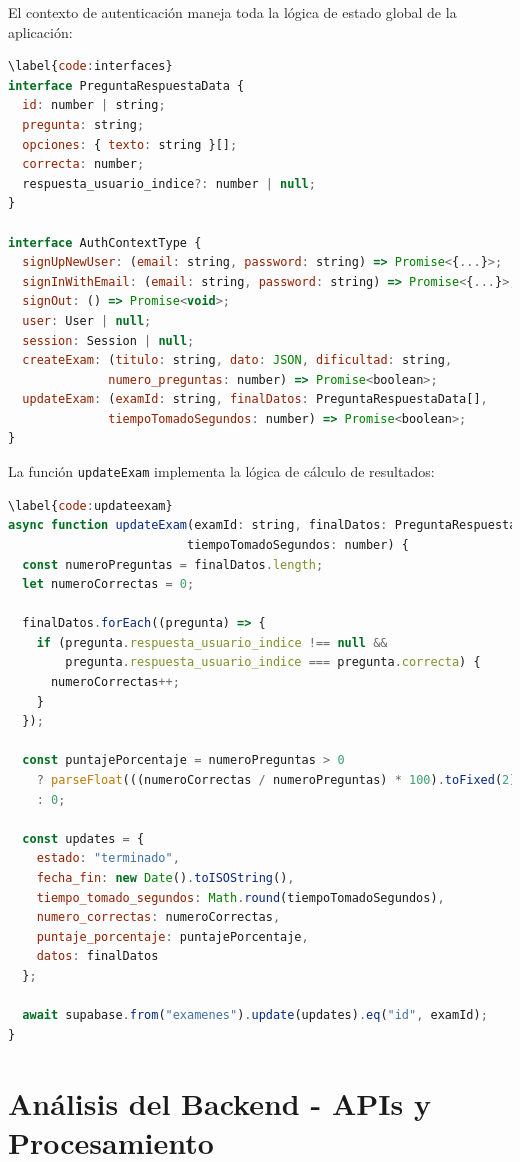 \documentclass[12pt,a4paper]{report}
\begin{document}
El contexto de autenticación maneja toda la lógica de estado global de la aplicación:

\begin{lstlisting}[language=JavaScript, caption={Código \ref{code:interfaces}: Interfaces de datos para preguntas}]
\label{code:interfaces}
interface PreguntaRespuestaData {
  id: number | string;
  pregunta: string;
  opciones: { texto: string }[];
  correcta: number;
  respuesta_usuario_indice?: number | null;
}

interface AuthContextType {
  signUpNewUser: (email: string, password: string) => Promise<{...}>;
  signInWithEmail: (email: string, password: string) => Promise<{...}>;
  signOut: () => Promise<void>;
  user: User | null;
  session: Session | null;
  createExam: (titulo: string, dato: JSON, dificultad: string, 
              numero_preguntas: number) => Promise<boolean>;
  updateExam: (examId: string, finalDatos: PreguntaRespuestaData[], 
              tiempoTomadoSegundos: number) => Promise<boolean>;
}
\end{lstlisting}

La función \texttt{updateExam} implementa la lógica de cálculo de resultados:

\begin{lstlisting}[language=JavaScript, caption={Código \ref{code:updateexam}: Algoritmo de cálculo de resultados}]
\label{code:updateexam}
async function updateExam(examId: string, finalDatos: PreguntaRespuestaData[], 
                         tiempoTomadoSegundos: number) {
  const numeroPreguntas = finalDatos.length;
  let numeroCorrectas = 0;

  finalDatos.forEach((pregunta) => {
    if (pregunta.respuesta_usuario_indice !== null &&
        pregunta.respuesta_usuario_indice === pregunta.correcta) {
      numeroCorrectas++;
    }
  });

  const puntajePorcentaje = numeroPreguntas > 0
    ? parseFloat(((numeroCorrectas / numeroPreguntas) * 100).toFixed(2))
    : 0;

  const updates = {
    estado: "terminado",
    fecha_fin: new Date().toISOString(),
    tiempo_tomado_segundos: Math.round(tiempoTomadoSegundos),
    numero_correctas: numeroCorrectas,
    puntaje_porcentaje: puntajePorcentaje,
    datos: finalDatos
  };

  await supabase.from("examenes").update(updates).eq("id", examId);
}
\end{lstlisting}

\section{Análisis del Backend - APIs y Procesamiento}
\end{document}
